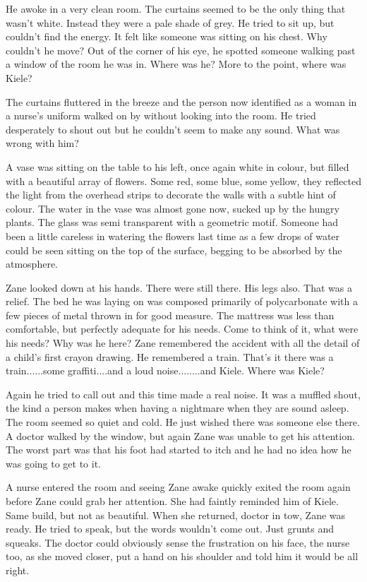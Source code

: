 \thoughtbreak



He awoke in a very clean room.  The curtains seemed to be the only thing that wasn't white.  Instead they were a pale shade of grey.  He tried to sit up, but couldn't find the energy.  It felt like someone was sitting on his chest.  Why couldn't he move?  Out of the corner of his eye, he spotted someone walking past a window of the room he was in.  Where was he?  More to the point, where was Kiele?

The curtains fluttered in the breeze and the person now identified as a woman in a nurse's uniform walked on by without looking into the room.  He tried desperately to shout out but he couldn't seem to make any sound.  What was wrong with him?

A vase was sitting on the table to his left, once again white in colour, but filled with a beautiful array of flowers.  Some red, some blue, some yellow, they reflected the light from the overhead strips to decorate the walls with a subtle hint of colour.  The water in the vase was almost gone now, sucked up by the hungry plants.  The glass was semi transparent with a geometric motif.  Someone had been a little careless in watering the flowers last time as a few drops of water could be seen sitting on the top of the surface, begging to be absorbed by the atmosphere.

Zane looked down at his hands.  There were still there.  His legs also.  That was a relief.  The bed he was laying on was composed primarily of polycarbonate with a few pieces of metal thrown in for good measure.  The mattress was less than comfortable, but perfectly adequate for his needs.  Come to think of it, what were his needs?  Why was he here?  Zane remembered the accident with all the detail of a child's first crayon drawing.  He remembered a train.  That's it there was a train......some graffiti....and a loud noise........and Kiele.  Where was Kiele?

Again he tried to call out and this time made a real noise.  It was a muffled shout, the kind a person makes when having a nightmare when they are sound asleep.  The room seemed so quiet and cold.  He just wished there was someone else there.  A doctor walked by the window, but again Zane was unable to get his attention.  The worst part was that his foot had started to itch and he had no idea how he was going to get to it.

A nurse entered the room and seeing Zane awake quickly exited the room again before Zane could grab her attention.  She had faintly reminded him of Kiele.  Same build, but not as beautiful.  When she returned, doctor in tow, Zane was ready.  He tried to speak, but the words wouldn't come out.  Just grunts and squeaks.  The doctor could obviously sense the frustration on his face, the nurse too, as she moved closer, put a hand on his shoulder and told him it would be all right.  

